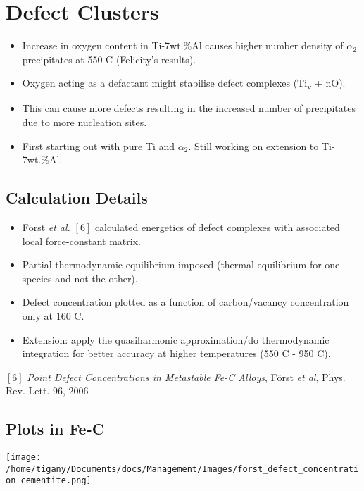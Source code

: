 \documentclass[11pt]{article}
\begin{document}
\section*{Defect Clusters}
\label{sec:org47b3c9c}

\begin{itemize}
\item Increase in oxygen content in Ti-7wt.\%Al causes higher number density of
\(\alpha_2\) precipitates at 550\textdegree{} C (Felicity's results).
\item Oxygen acting as a defactant might stabilise defect complexes (Ti\textsubscript{v} + nO).
\item This can cause more defects resulting in the increased number of precipitates due to more nucleation sites.
\item First starting out with pure Ti and \(\alpha_2\). Still working on extension to Ti-7wt.\%Al.
\end{itemize}


\subsection*{Calculation Details}
\label{sec:orgcb9cfe0}
\begin{itemize}
\item Först \emph{et al.} \([6]\) calculated energetics of defect complexes with associated local
force-constant matrix.
\item Partial thermodynamic equilibrium imposed (thermal equilibrium for one species and not the other).
\item Defect concentration plotted as a function of carbon/vacancy concentration
only at 160\textdegree{} C.
\item Extension: apply the quasiharmonic approximation/do thermodynamic integration
for better accuracy at higher temperatures (550\textdegree{} C - 950\textdegree{} C).
\end{itemize}

\([6]\) \emph{Point Defect Concentrations in Metastable Fe-C Alloys}, Först \emph{et
al}, Phys. Rev. Lett. 96, 2006



\subsection*{Plots in Fe-C}
\label{sec:org1247700}
\begin{center}
\texttt{[image: /home/tigany/Documents/docs/Management/Images/forst\_defect\_concentration\_cementite.png]}
\label{orgdab65fb}
\end{center}
\end{document}
